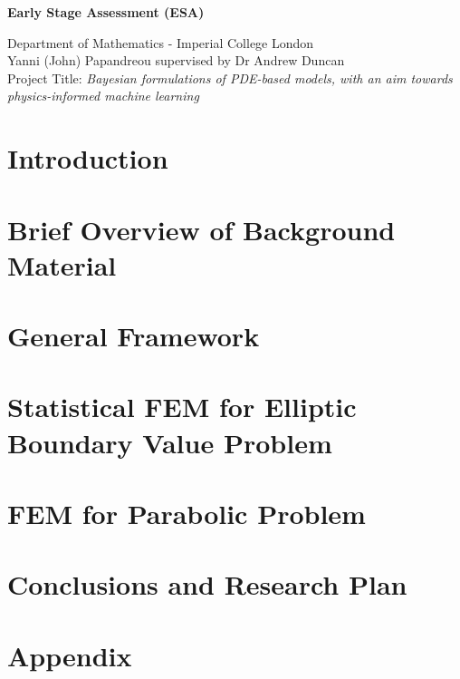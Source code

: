 \documentclass{article}
\theoremstyle{definition}
\theoremstyle{remark}
\theoremstyle{remark}
\begin{document}
    \begin{center}
        \vspace*{0.5cm}

        \LARGE
        \textbf{Early Stage Assessment (ESA)}

        \vspace{0.5cm}
        \large
        Department of Mathematics - Imperial College London \\
        Yanni (John) Papandreou supervised by Dr Andrew Duncan \\
        Project Title: \textit{Bayesian formulations of PDE-based models, with an aim towards physics-informed machine learning}
    \end{center}

\setlength\parskip{10pt}
\setlength\parindent{20pt}

\section{Introduction}
\label{intro}


\section{Brief Overview of Background Material}
\label{lit_review}


\section{General Framework}
\label{general_framework}


\section{Statistical FEM for Elliptic Boundary Value Problem}
\label{elliptic_bv_prob}


\section{FEM for Parabolic Problem}
\label{parabolic_prob}

\section{Conclusions and Research Plan}
\label{conclusion}

\section{Appendix}
\label{appendix}


% 
\end{document}
